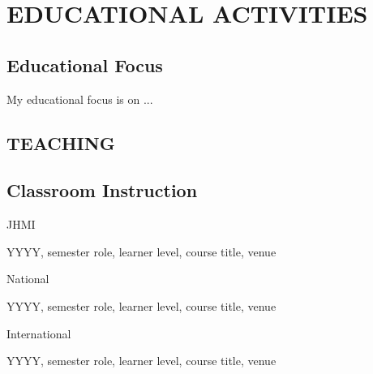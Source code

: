 \documentclass[11pt]{article}
\newenvironment{lyxlist}[1]
	{\begin{list}{}
		{\setlength\itemsep{-0.5ex}
		\settowidth{\labelwidth}{#1}
		 \setlength{\leftmargin}{\labelwidth}
		 \addtolength{\leftmargin}{\labelsep}
		 \renewcommand{\makelabel}[1]{##1\hfil}}}
	{\end{list}}
\newcommand{\mylift}[1]{\vspace*{#1}}
\begin{document}
\section*{EDUCATIONAL ACTIVITIES} 

\subsection*{Educational Focus}
\mylift{-.5em}
My educational focus is on ...  

\subsection*{TEACHING}

\subsection*{Classroom Instruction}
\begin{lyxlist}{2020 (Winter, virtual)}

\item[{\textcolor{color1}{JHMI}}]

\item[{YYYY, semester}]role, learner level, course title, venue

\item[{\textcolor{color1}{National}}]

\item[{YYYY, semester}]role, learner level, course title, venue

\item[{\textcolor{color1}{International}}]
\item[{YYYY, semester}]role, learner level, course title, venue

\end{lyxlist}
\end{document}
